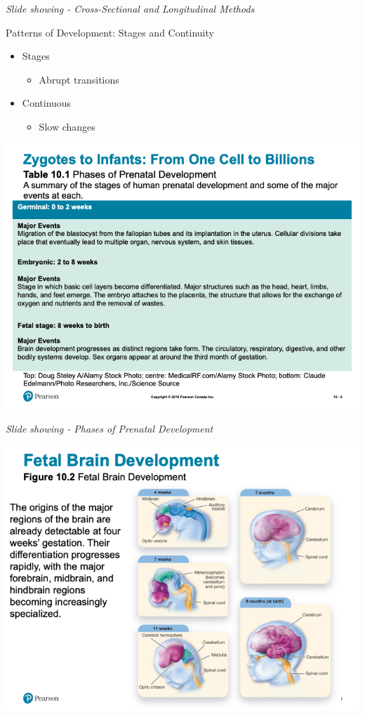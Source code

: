 \documentclass[
]{book}
\providecommand{\tightlist}{%
  \setlength{\itemsep}{0pt}\setlength{\parskip}{0pt}}
\begin{document}
\begin{reflect}
\emph{Slide showing - Cross-Sectional and Longitudinal Methods}

Patterns of Development: Stages and Continuity

\begin{itemize}
\tightlist
\item
  Stages

  \begin{itemize}
  \tightlist
  \item
    Abrupt transitions\\
  \end{itemize}
\item
  Continuous

  \begin{itemize}
  \tightlist
  \item
    Slow changes
  \end{itemize}
\end{itemize}

\includegraphics{assets/unit_3/slide_9.png}

\emph{Slide showing - Phases of Prenatal Development}

\includegraphics{assets/unit_3/slide_10.png}


\end{reflect}
\end{document}
